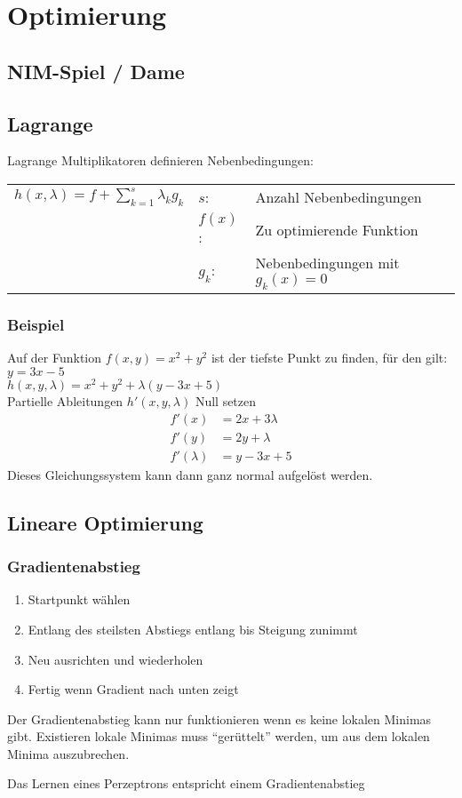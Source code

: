 \section{Optimierung}
\subsection{NIM-Spiel / Dame}

\subsection{Lagrange}
Lagrange Multiplikatoren definieren Nebenbedingungen:\\
\begin{tabular}{l l l}
	{$ h(x,\lambda) = f + \sum\limits_{k=1}^s{\lambda_k g_k} $ } &
		$s$:    &Anzahl Nebenbedingungen \\
		&$f(x)$:&Zu optimierende Funktion \\
		&$g_k$: &Nebenbedingungen mit $g_k(x) = 0$
\end{tabular}
\subsubsection{Beispiel}
Auf der Funktion $f(x,y) = x^2 + y^2$ ist der tiefste Punkt zu finden,
für den gilt: $y = 3x - 5$ \\
$ h(x,y,\lambda) = x^2 + y^2 + \lambda(y - 3x + 5) $ \\
Partielle Ableitungen $h'(x,y,\lambda)$ Null setzen
\begin{align}
	f'(x)& = 2 x + 3 \lambda \\
	f'(y)& = 2 y + \lambda \\
	f'(\lambda)& = y - 3x + 5
\end{align}
Dieses Gleichungssystem kann dann ganz normal aufgelöst werden.

\subsection{Lineare Optimierung}
\subsubsection{Gradientenabstieg}
\begin{enumerate}
	\item Startpunkt wählen
	\item Entlang des steilsten Abstiegs entlang bis Steigung zunimmt
	\item Neu ausrichten und wiederholen
	\item Fertig wenn Gradient nach unten zeigt
\end{enumerate}
Der Gradientenabstieg kann nur funktionieren wenn es keine lokalen
Minimas gibt. Existieren lokale Minimas muss ``gerüttelt'' werden, um
aus dem lokalen Minima auszubrechen.

Das Lernen eines Perzeptrons entspricht einem Gradientenabstieg

